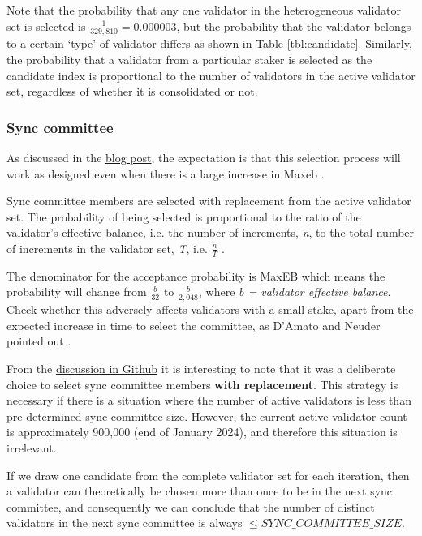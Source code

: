 Note that the probability that any one validator in the heterogeneous validator set is selected is $\frac{1}{329,810} = 0.000003$, but the probability that the validator belongs to a certain `type' of validator differs as shown in Table \ref{tbl:candidate}. Similarly, the probability that a validator from a particular staker is selected as the candidate index is proportional to the number of validators in the active validator set, regardless of whether it is consolidated or not.

\clearpage
\subsubsection*{Sync committee}
As discussed in the \href{https://ethresear.ch/t/increase-the-max-effective-balance-a-modest-proposal/15801/3}{blog post}, the expectation is that this selection process will work as designed even when there is a large increase in Max\gls{eb} \cite{Neuder2023a}.

Sync committee members are selected with replacement from the active validator set. The probability of being selected is proportional to the ratio of the validator's effective balance, i.e. the number of increments, \textit{n}, to the total number of increments in the validator set, \textit{T}, i.e. $\frac{n}{T}$ \cite{Edgington2023}. 

The denominator for the acceptance probability is MaxEB which means the probability will change from $\frac{b}{32}$ to $\frac{b}{2,048}$, where \textit{b = validator effective balance}. Check whether this adversely affects validators with a small stake, apart from the expected increase in time to select the committee, as D'Amato and Neuder pointed out \cite{damato2023}.

From the \href{https://github.com/ethereum/consensus-specs/pull/2130#discussion\_r532499943}{discussion in Github} it is interesting to note that it was a deliberate choice to select sync committee members \textbf{with replacement}. This strategy is necessary if there is a situation where the number of active validators is less than pre-determined sync committee size. However, the current active validator count is approximately 900,000 (end of January 2024), and therefore this situation is irrelevant.

If we draw one candidate from the complete validator set for each iteration, then a validator can theoretically be chosen more than once to be in the next sync committee, and consequently we can conclude that the number of distinct validators in the next sync committee is always $\leqslant SYNC\_COMMITTEE\_SIZE$.  

